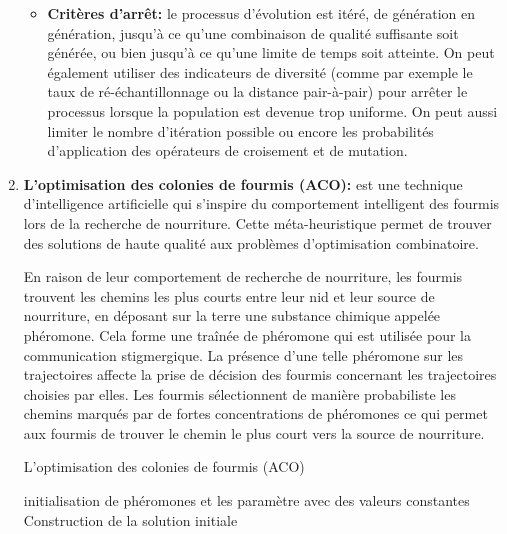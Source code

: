 \begin{enumerate}[label=\alph*)]
\begin{itemize}
	\item \textbf{Critères d’arrêt: } le processus d’évolution est itéré, de génération en génération, jusqu’à ce qu’une combinaison de qualité suffisante soit générée, ou bien jusqu’à ce qu’une limite de temps soit atteinte. On peut également utiliser des indicateurs de diversité (comme par exemple le taux de ré-échantillonnage ou la distance pair-à-pair) pour arrêter le processus lorsque la population est devenue trop uniforme. On peut aussi limiter le nombre d’itération possible ou encore les probabilités d’application des opérateurs de croisement et de 
mutation.
 
\end{itemize}	

	
	\item \textbf{L’optimisation des colonies de fourmis (ACO): }est une technique d’intelligence artificielle qui s'inspire du comportement intelligent des fourmis lors de la recherche de nourriture. Cette méta-heuristique permet de trouver des solutions de haute qualité aux problèmes d’optimisation combinatoire. 

En raison de leur comportement de recherche de nourriture, les fourmis trouvent les chemins les plus courts entre leur nid et leur source de nourriture, en déposant sur la terre une substance chimique appelée phéromone. Cela forme une traînée de phéromone qui est utilisée pour la communication stigmergique. La présence d'une telle phéromone sur les trajectoires affecte la prise de décision des fourmis concernant les trajectoires choisies par elles. Les fourmis sélectionnent de manière probabiliste les chemins marqués par de fortes concentrations de phéromones ce qui permet aux fourmis de trouver le chemin le plus court vers la source de nourriture.\\


\begin{algorithm}[H]
\caption{L’optimisation des colonies de fourmis (ACO)}
\SetAlgoLined
\DontPrintSemicolon

initialisation de phéromones et les paramètre avec des valeurs constantes \;
Construction de la solution initiale \;


\end{algorithm}
\end{enumerate}
